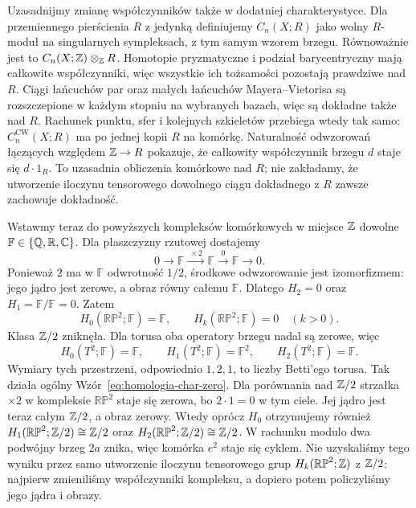 \begin{uwaga}
\label{rem:homologia-wspolczynniki-przestrzeni}
Uzasadnijmy zmianę współczynników także w dodatniej charakterystyce.
Dla przemiennego pierścienia $R$ z jedynką definiujemy $C_n(X;R)$
jako wolny $R$-moduł na singularnych sympleksach, z tym samym wzorem brzegu.
Równoważnie jest to $C_n(X;\mathbb{Z})\otimes_{\mathbb{Z}}R$.
Homotopie pryzmatyczne i podział barycentryczny mają całkowite współczynniki,
więc wszystkie ich tożsamości pozostają prawdziwe nad $R$.
Ciągi łańcuchów par oraz małych łańcuchów Mayera--Vietorisa są
rozszczepione w każdym stopniu na wybranych bazach, więc są dokładne także nad $R$.
Rachunek punktu, sfer i kolejnych szkieletów przebiega wtedy tak samo:
$C_n^{\mathrm{CW}}(X;R)$ ma po jednej kopii $R$ na komórkę.
Naturalność odwzorowań łączących względem $\mathbb{Z}\to R$ pokazuje,
że całkowity współczynnik brzegu $d$ staje się $d\cdot1_R$.
To uzasadnia obliczenia komórkowe nad $R$; nie zakładamy,
że utworzenie iloczynu tensorowego dowolnego ciągu dokładnego
z $R$ zawsze zachowuje dokładność.
\end{uwaga}

\begin{przyklad}
\label{prz:zmiana-wspolczynnikow-rp2-torus}
Wstawmy teraz do powyższych kompleksów komórkowych
w miejsce $\mathbb{Z}$ dowolne
$\mathbb F\in\{\mathbb{Q},\mathbb{R},\mathbb{C}\}$.
Dla płaszczyzny rzutowej dostajemy
\[
 0\longrightarrow\mathbb F
 \xrightarrow{\;\times2\;}\mathbb F
 \xrightarrow{\;0\;}\mathbb F
 \longrightarrow0.
\]
Ponieważ $2$ ma w $\mathbb F$ odwrotność
$1/2$, środkowe odwzorowanie jest
izomorfizmem: jego jądro jest zerowe, a obraz równy całemu
$\mathbb F$. Dlatego $H_2=0$ oraz $H_1=\mathbb F/\mathbb F=0$.
Zatem
\[
 H_0(\mathbb{RP}^2;\mathbb F)=\mathbb F,
 \qquad H_k(\mathbb{RP}^2;\mathbb F)=0\quad(k>0).
\]
Klasa $\mathbb{Z}/2$ zniknęła. Dla torusa oba
operatory brzegu nadal są zerowe, więc
\[
 H_0(T^2;\mathbb F)=\mathbb F,\qquad
 H_1(T^2;\mathbb F)=\mathbb F^2,\qquad
 H_2(T^2;\mathbb F)=\mathbb F.
\]
Wymiary tych przestrzeni, odpowiednio
$1,2,1$, to liczby Betti'ego torusa.
Tak działa ogólny
Wzór~\eqref{eq:homologia-char-zero}.
Dla porównania nad $\mathbb{Z}/2$ strzałka
$\times2$ w kompleksie $\mathbb{RP}^2$
staje się zerowa, bo $2\cdot1=0$ w tym ciele.
Jej jądro jest teraz całym $\mathbb{Z}/2$, a obraz zerowy.
Wtedy oprócz $H_0$
otrzymujemy również
$H_1(\mathbb{RP}^2;\mathbb{Z}/2)\cong\mathbb{Z}/2$
oraz $H_2(\mathbb{RP}^2;\mathbb{Z}/2)\cong\mathbb{Z}/2$.
W rachunku modulo dwa podwójny brzeg $2a$ znika,
więc komórka $e^2$ staje się cyklem.
Nie uzyskaliśmy tego wyniku przez samo utworzenie iloczynu tensorowego
grup $H_k(\mathbb{RP}^2;\mathbb{Z})$ z $\mathbb{Z}/2$: najpierw zmieniliśmy współczynniki
kompleksu, a dopiero potem policzyliśmy jego jądra i obrazy.
\end{przyklad}

